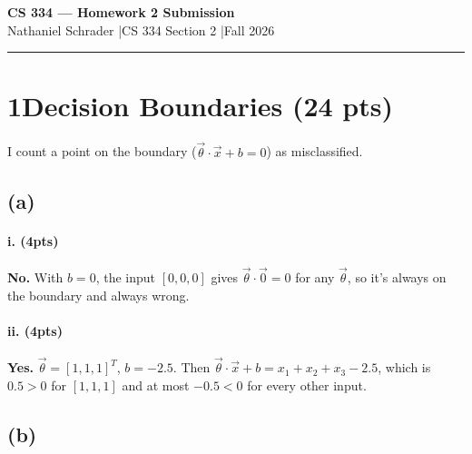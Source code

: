 \documentclass[11pt]{article}
\newcommand{\vth}{\vec\theta}
\begin{document}
\thispagestyle{hw}

\begin{center}
{\Large\bfseries CS 334 --- Homework 2 Submission}\\[4pt]
{\large Nathaniel Schrader \quad|\quad CS 334 Section 2 \quad|\quad Fall 2026}\\[10pt]
\end{center}
\vspace{6pt}
\hrule
\vspace{10pt}

\section*{1\quad Decision Boundaries (24 pts)}

I count a point on the boundary ($\vth\cdot\vec x+b=0$) as misclassified.

\subsection*{(a)}

\paragraph{i. (4pts)} \textbf{No.} With $b=0$, the input $[0,0,0]$ gives $\vth\cdot\vec 0=0$ for any $\vth$, so it's always on the boundary and always wrong.

\paragraph{ii. (4pts)} \textbf{Yes.} $\vth=[1,1,1]^T$, $b=-2.5$. Then $\vth\cdot\vec x+b=x_1+x_2+x_3-2.5$, which is $0.5>0$ for $[1,1,1]$ and at most $-0.5<0$ for every other input.

\subsection*{(b)}
\end{document}

